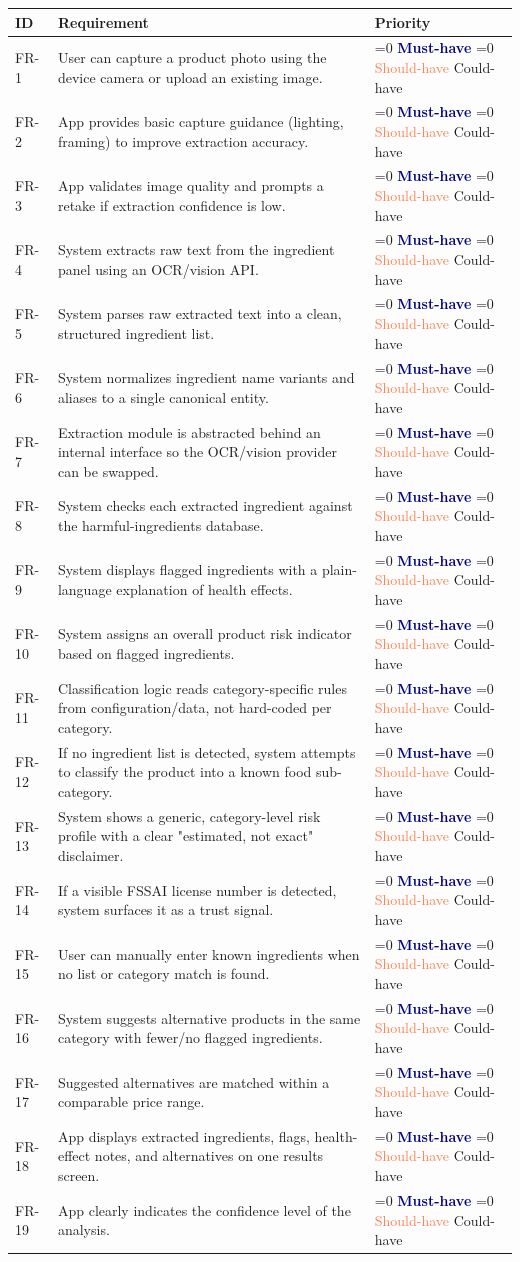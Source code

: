 \documentclass[11pt,a4paper]{article}
\newcommand{\priority}[1]{%
  \ifnum\pdfstrcmp{#1}{Must}=0 \textcolor{navy}{\textbf{Must-have}}%
  \else\ifnum\pdfstrcmp{#1}{Should}=0 \textcolor{coral}{Should-have}%
  \else \textcolor{muted}{Could-have}%
  \fi\fi
}
\begin{document}
\begin{longtable}{@{}p{1.6cm}p{9.7cm}p{2.3cm}@{}}
\toprule
\textbf{ID} & \textbf{Requirement} & \textbf{Priority} \\
\midrule
\endhead
FR-1  & User can capture a product photo using the device camera or upload an existing image. & \priority{Must} \\
FR-2  & App provides basic capture guidance (lighting, framing) to improve extraction accuracy. & \priority{Should} \\
FR-3  & App validates image quality and prompts a retake if extraction confidence is low. & \priority{Should} \\
FR-4  & System extracts raw text from the ingredient panel using an OCR/vision API. & \priority{Must} \\
FR-5  & System parses raw extracted text into a clean, structured ingredient list. & \priority{Must} \\
FR-6  & System normalizes ingredient name variants and aliases to a single canonical entity. & \priority{Must} \\
FR-7  & Extraction module is abstracted behind an internal interface so the OCR/vision provider can be swapped. & \priority{Must} \\
FR-8  & System checks each extracted ingredient against the harmful-ingredients database. & \priority{Must} \\
FR-9  & System displays flagged ingredients with a plain-language explanation of health effects. & \priority{Must} \\
FR-10 & System assigns an overall product risk indicator based on flagged ingredients. & \priority{Should} \\
FR-11 & Classification logic reads category-specific rules from configuration/data, not hard-coded per category. & \priority{Must} \\
FR-12 & If no ingredient list is detected, system attempts to classify the product into a known food sub-category. & \priority{Must} \\
FR-13 & System shows a generic, category-level risk profile with a clear "estimated, not exact" disclaimer. & \priority{Must} \\
FR-14 & If a visible FSSAI license number is detected, system surfaces it as a trust signal. & \priority{Could} \\
FR-15 & User can manually enter known ingredients when no list or category match is found. & \priority{Should} \\
FR-16 & System suggests alternative products in the same category with fewer/no flagged ingredients. & \priority{Must} \\
FR-17 & Suggested alternatives are matched within a comparable price range. & \priority{Should} \\
FR-18 & App displays extracted ingredients, flags, health-effect notes, and alternatives on one results screen. & \priority{Must} \\
FR-19 & App clearly indicates the confidence level of the analysis. & \priority{Must} \\
\bottomrule
\end{longtable}
\end{document}

